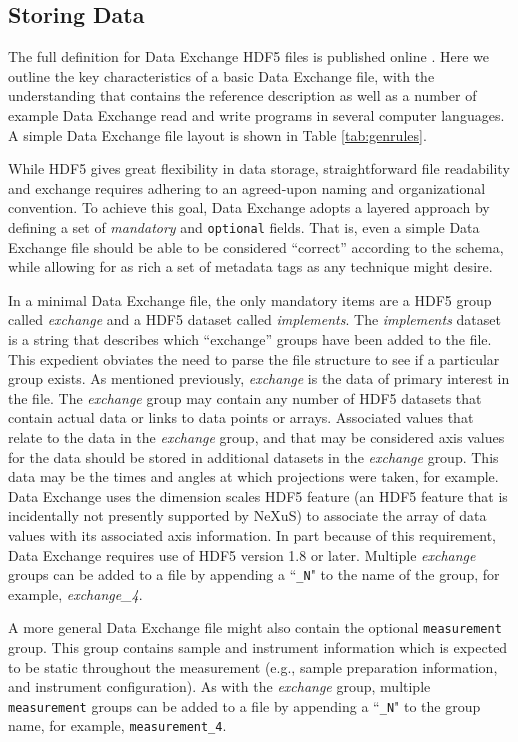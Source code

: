 \documentclass[pdf]{iucr}              %
\begin{document}
\subsection{Storing Data}

The full definition for Data Exchange HDF5 files is published online \cite{data_exchange}. Here we outline the key characteristics of a basic Data Exchange file, with the understanding that \cite{data_exchange} contains the reference description as well as a number of example Data Exchange read and write programs in several computer languages. A simple Data Exchange file layout is shown in Table \ref{tab:genrules}.

While HDF5 gives great flexibility in data storage, straightforward file readability and exchange requires adhering to an agreed-upon naming and organizational convention. To achieve this goal, Data Exchange adopts a layered approach by defining a set of \emph{mandatory} and \texttt{optional} fields. That is, even a simple Data Exchange file should be able to be considered ``correct'' according to the schema, while allowing for as rich a set of metadata tags as any technique might desire.  

In a minimal Data Exchange file, the only mandatory items are a HDF5 group called \emph{exchange} and a HDF5 dataset called \emph{implements}. The \emph{implements} dataset is a string that describes which ``exchange'' groups have been added to the file. This expedient obviates the need to parse the file structure to see if a particular group exists. As mentioned previously, \emph{exchange} is the data of primary interest in the file.  The \emph{exchange} group may contain any number of HDF5 datasets that contain actual data or links to data points or arrays. Associated values that relate to the data in the \emph{exchange} group, and that may be considered axis values for the data should be stored in additional datasets in the \emph{exchange} group. This data may be the times and angles at which projections were taken, for example. Data Exchange uses the dimension scales HDF5 feature (an HDF5 feature that is incidentally not presently supported by NeXuS) to associate the array of data values with its associated axis information. In part because of this requirement, Data Exchange requires use of HDF5 version 1.8 or later. Multiple \emph{exchange} groups can be added to a file by appending a ``\texttt{\_N}" to the name of the group, for example, \emph{exchange\_4}.

A more general Data Exchange file might also contain the optional \texttt{measurement} group. This group contains sample and instrument information which is expected to be static throughout the measurement (e.g., sample preparation information, and instrument configuration). As with the \emph{exchange} group, multiple \texttt{measurement} groups can be added to a file by appending a ``\texttt{\_N}" to the group name, for example, \texttt{measurement\_4}.
\end{document}
